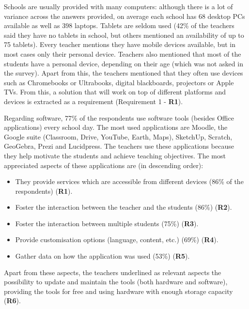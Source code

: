 Schools are usually provided with many computers: although there is a lot of variance across the answers provided, on average each school has 68 desktop PCs available as well as 398 laptops. Tablets are seldom used (42\% of the teachers said they have no tablets in school, but others mentioned an availability of up to 75 tablets). Every teacher mentions they have mobile devices available, but in most cases only their personal device. Teachers also mentioned that most of the students have a personal device, depending on their age (which was not asked in the survey). Apart from this, the teachers mentioned that they often use devices such as Chromebooks or Ultrabooks, digital blackboards, projectors or Apple TVs. From this, a solution that will work on top of different platforms and devices is extracted as a requirement (Requirement 1 - \textbf{R1}).

Regarding software, 77\% of the respondents use software tools (besides Office applications) every school day. The most used applications are Moodle, the Google suite (Classroom, Drive, YouTube, Earth, Maps), SketchUp, Scratch, GeoGebra, Prezi and Lucidpress. The teachers use these applications because they help motivate the students and achieve teaching objectives. The most appreciated aspects of these applications are (in descending order):
\begin{itemize}
        \item They provide services which are accessible from different devices (86\% of the respondents) (\textbf{R1}).
        \item Foster the interaction between the teacher and the students (86\%) (\textbf{R2}).
        \item Foster the interaction between multiple students (75\%) (\textbf{R3}).
        \item Provide customisation options (language, content, etc.) (69\%) (\textbf{R4}).
        \item Gather data on how the application was used (53\%) (\textbf{R5}).
\end{itemize}

Apart from these aspects, the teachers underlined as relevant aspects the possibility to update and maintain the tools (both hardware and software), providing the tools for free and using hardware with enough storage capacity (\textbf{R6}).

